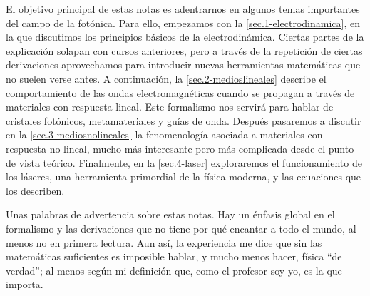 El objetivo principal de estas notas es adentrarnos en algunos temas importantes del campo de la fotónica. Para ello, empezamos con la \cref{sec.1-electrodinamica}, en la que discutimos los principios básicos de la electrodinámica. Ciertas partes de la explicación solapan con cursos anteriores, pero a través de la repetición de ciertas derivaciones aprovechamos para introducir nuevas herramientas matemáticas que no suelen verse antes. A continuación, la \cref{sec.2-medioslineales} describe el comportamiento de las ondas electromagnéticas cuando se propagan a través de materiales con respuesta lineal. Este formalismo nos servirá para hablar de cristales fotónicos, metamateriales y guías de onda. Después pasaremos a discutir en la \cref{sec.3-mediosnolineales} la fenomenología asociada a materiales con respuesta no lineal, mucho más interesante pero más complicada desde el punto de vista teórico. Finalmente, en la \cref{sec.4-laser} exploraremos el funcionamiento de los láseres, una herramienta primordial de la física moderna, y las ecuaciones que los describen.

Unas palabras de advertencia sobre estas notas. Hay un énfasis global en el formalismo y las derivaciones que no tiene por qué encantar a todo el mundo, al menos no en primera lectura. Aun así, la experiencia me dice que sin las matemáticas suficientes es imposible hablar, y mucho menos hacer, física ``de verdad''; al menos según mi definición que, como el profesor soy yo, es la que importa.
